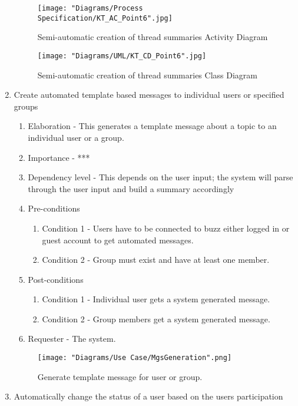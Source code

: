 \documentclass[12pt]{article}
\begin{document}
\begin{enumerate}
\begin{figure}[h]
	\centering
	\texttt{[image: "Diagrams/Process Specification/KT\_AC\_Point6".jpg]}
	\caption{Semi-automatic creation of thread summaries Activity Diagram}
\end{figure}
\begin{figure}[h]
	\centering
	\texttt{[image: "Diagrams/UML/KT\_CD\_Point6".jpg]}
	\caption{Semi-automatic creation of thread summaries Class Diagram}
\end{figure}
\clearpage %
   \item Create automated template based messages to individual users or specified groups   %
  \begin{enumerate}
    \item Elaboration - This generates a template message about a topic to an individual user or a group.
    \item Importance - ***
    \item Dependency level - This depends on the user input; the system will parse through the user input and build a summary accordingly
    \item Pre-conditions
    \begin{enumerate}
 		\item Condition 1 - Users have to be connected to buzz either logged in or guest account to get automated messages.
    	\item Condition 2 - Group must exist and have at least one member.
    \end{enumerate}
        \item Post-conditions
    \begin{enumerate}
    	\item Condition 1 - Individual user gets a system generated message.
    	\item Condition 2 - Group members get a system generated message.
    \end{enumerate}
    \item Requester - The system.
  \end{enumerate}
	\begin{figure}[h]
    	\centering
    	\texttt{[image: "Diagrams/Use Case/MgsGeneration".png]}
    	\caption{Generate template message for user or group.}
    \end{figure}
\clearpage %
   \item Automatically change the status of a user based on the users participation %
  \begin{enumerate}

\end{enumerate}
\end{enumerate}
\end{document}
